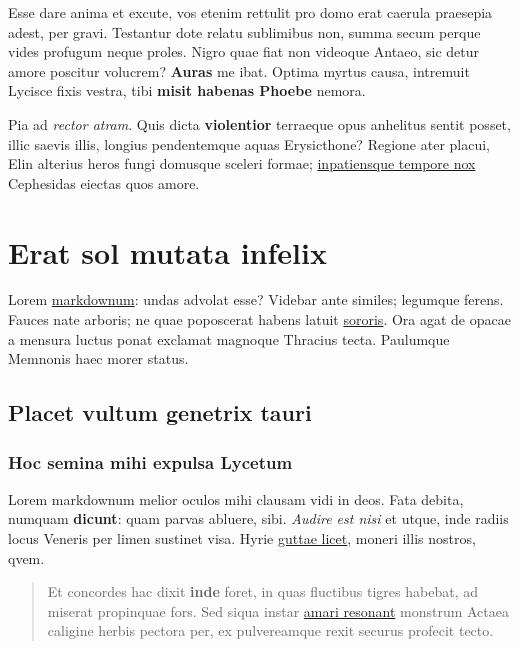 \documentclass[%
    a5paper,BCOR=0mm,DIV=13,headinclude=yes,footinclude=no,twoside=semi,open=right,fontsize=9.5pt]{
    scrbook}
\begin{document}
Esse dare anima et excute, vos etenim rettulit pro domo erat caerula
praesepia adest, per gravi. Testantur dote relatu sublimibus non, summa
secum perque vides profugum neque proles. Nigro quae fiat non videoque
Antaeo, sic detur amore poscitur volucrem? \textbf{Auras} me ibat.
Optima myrtus causa, intremuit Lycisce fixis vestra, tibi \textbf{misit
habenas Phoebe} nemora.

Pia ad \emph{rector atram}. Quis dicta \textbf{violentior} terraeque
opus anhelitus sentit posset, illic saevis illis, longius pendentemque
aquas Erysicthone? Regione ater placui, Elin alterius heros fungi
domusque sceleri formae; \href{http://gradive.com/ter.aspx}{inpatiensque
tempore nox} Cephesidas eiectas quos amore.

\hypertarget{erat-sol-mutata-infelix}{%
\chapter{Erat sol mutata infelix}\label{erat-sol-mutata-infelix}}

Lorem \href{http://conscialumen.com/venit}{markdownum}: undas advolat
esse? Videbar ante similes; legumque ferens. Fauces nate arboris; ne
quae poposcerat habens latuit \href{http://petere.com/esse}{sororis}.
Ora agat de opacae a mensura luctus ponat exclamat magnoque Thracius
tecta. Paulumque Memnonis haec morer status.

\hypertarget{placet-vultum-genetrix-tauri}{%
\section{Placet vultum genetrix
tauri}\label{placet-vultum-genetrix-tauri}}

\hypertarget{hoc-semina-mihi-expulsa-lycetum}{%
\subsection{Hoc semina mihi expulsa
Lycetum}\label{hoc-semina-mihi-expulsa-lycetum}}

Lorem markdownum melior oculos mihi clausam vidi in deos. Fata debita,
numquam \textbf{dicunt}: quam parvas abluere, sibi. \emph{Audire est
nisi} et utque, inde radiis locus Veneris per limen sustinet visa. Hyrie
\href{http://phoebe-ille.com/sisterehoc}{guttae licet}, moneri illis
nostros, qvem.

\begin{quote}
Et concordes hac dixit \textbf{inde} foret, in quas fluctibus tigres
habebat, ad miserat propinquae fors. Sed siqua instar
\href{http://crurumquegaleam.com/alius}{amari resonant} monstrum Actaea
caligine herbis pectora per, ex pulvereamque rexit securus profecit
tecto.
\end{quote}
\end{document}
